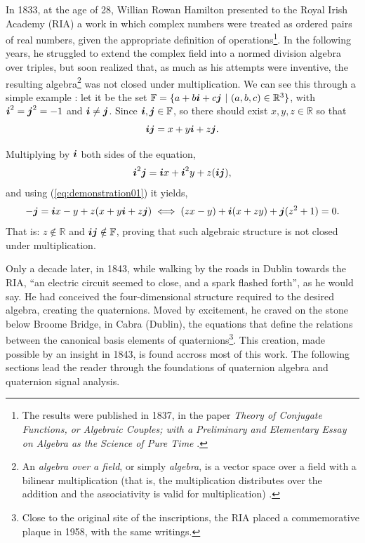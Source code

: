 In 1833, at the age of 28, Willian Rowan Hamilton presented to the Royal Irish Academy (RIA) a work in which complex numbers were treated as ordered pairs of real numbers, given the appropriate definition of operations\footnote{The results were published in 1837, in the paper \emph{Theory of Conjugate Functions, or Algebraic Couples; with a Preliminary and Elementary Essay on Algebra as the Science of Pure Time} \cite{hamilton1837theory}.}. In the following years, he struggled to extend the complex field into a normed division algebra over triples, but soon realized that, as much as his attempts were inventive, the resulting algebra\footnote{An \textit{algebra over a field}, or simply \textit{algebra}, is a vector space over a field with a bilinear multiplication (that is, the multiplication distributes over the addition and the associativity is valid for multiplication) \cite{schafer1955introduction}.} was not closed under multiplication. We can see this through a simple example \cite{santos2011algebra}: let it be the set $\mathbb{F} = \{ a + b \qi + c \qj  \ | \ (a, b, c) \in \mathbb{R}^3\}$, with $\boldsymbol{i}^2 = \boldsymbol{j}^2 = -1$ and $\boldsymbol{i} \neq \boldsymbol{j}$. Since $\boldsymbol{i}, \boldsymbol{j} \in \mathbb{F}$, so there should exist $x, y, z \in \mathbb{R}$ so that
\begin{equation}
\boldsymbol{i} \boldsymbol{j} = x + y \boldsymbol{i} + z \boldsymbol{j}.
\label{eq:demonstration01}
\end{equation}

Multiplying by $\boldsymbol{i}$ both sides of the equation,
\begin{equation}
\boldsymbol{i}^2 \boldsymbol{j} = \boldsymbol{i} x + \boldsymbol{i}^2 y + z (\boldsymbol{i} \boldsymbol{j}),
\end{equation}
and using (\ref{eq:demonstration01}) it yields,
\begin{equation}
- \boldsymbol{j} = \boldsymbol{i} x - y + z (x + y \boldsymbol{i} + z \boldsymbol{j})
\iff
(zx - y) + \boldsymbol{i} (x + zy) + \boldsymbol{j} (z^2 + 1) = 0.
\end{equation}
That is: $z \notin \mathbb{R}$ and $ \boldsymbol{i} \boldsymbol{j} \notin \mathbb{F} $, proving that such algebraic structure is not closed under multiplication.

Only a decade later, in 1843, while walking by the roads in Dublin towards the RIA, ``an electric circuit seemed to close, and a spark flashed forth'', as he would say. He had conceived the four-dimensional structure required to the desired algebra, creating the quaternions. Moved by excitement, he craved on the stone below Broome Bridge, in Cabra (Dublin), the equations that define the relations between the canonical basis elements of quaternions\footnote{Close to the original site of the inscriptions, the RIA placed a commemorative plaque in 1958, with the same writings.}. This creation, made possible by an insight in 1843, is found accross most of this work. The following sections lead the reader through the foundations of quaternion algebra and quaternion signal analysis.


